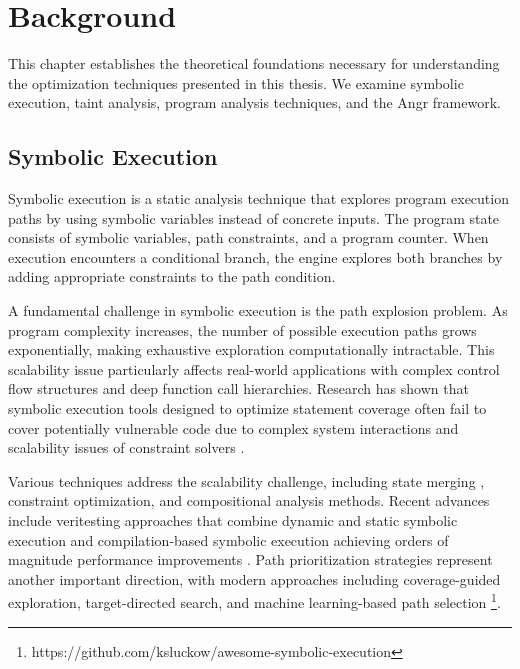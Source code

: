 \chapter{Background}


This chapter establishes the theoretical foundations necessary for understanding the optimization techniques presented in this thesis. We examine symbolic execution, taint analysis, program analysis techniques, and the Angr framework.

\section{Symbolic Execution}

Symbolic execution is a static analysis technique that explores program execution paths by using symbolic variables instead of concrete inputs. The program state consists of symbolic variables, path constraints, and a program counter. When execution encounters a conditional branch, the engine explores both branches by adding appropriate constraints to the path condition.

A fundamental challenge in symbolic execution is the path explosion problem. As program complexity increases, the number of possible execution paths grows exponentially, making exhaustive exploration computationally intractable. This scalability issue particularly affects real-world applications with complex control flow structures and deep function call hierarchies. Research has shown that symbolic execution tools designed to optimize statement coverage often fail to cover potentially vulnerable code due to complex system interactions and scalability issues of constraint solvers \cite{schwartz_all_2010}.

Various techniques address the scalability challenge, including state merging \cite{kuznetsov_efficient_2012}, constraint optimization, and compositional analysis methods. Recent advances include veritesting approaches that combine dynamic and static symbolic execution \cite{avgerinos_enhancing_2014} and compilation-based symbolic execution achieving orders of magnitude performance improvements \cite{poeplau_symbolic_2020}. Path prioritization strategies represent another important direction, with modern approaches including coverage-guided exploration, target-directed search, and machine learning-based path selection \cite{cha_learning_2021}\footnote{https://github.com/ksluckow/awesome-symbolic-execution}.

